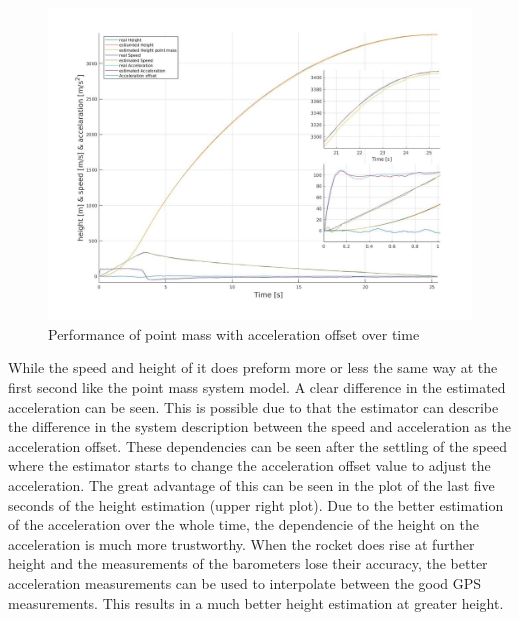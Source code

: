 \begin{figure}[h!]
 \centering
 \includegraphics[width=.8 \textwidth]{./Pictures/PointMassOffsetPerformance.jpg}
 \caption{Performance of point mass with acceleration offset over time}
 \label{fig:PointMassOffsetPerformance}
\end{figure}

While the speed and height of it does preform more or less the same way at the first second like the point mass system model.
A clear difference in the estimated acceleration can be seen.
This is possible due to that the estimator can describe the difference in the system description between the speed and acceleration as the acceleration offset.
These dependencies can be seen after the settling of the speed where the estimator starts to change the acceleration offset value to adjust the acceleration.
The great advantage of this can be seen in the plot of the last five seconds of the height estimation (upper right plot).
Due to the better estimation of the acceleration over the whole time, the dependencie of the height on the acceleration is much more trustworthy.
When the rocket does rise at further height and the measurements of the barometers lose their accuracy,
the better acceleration measurements can be used to interpolate between the good GPS measurements.
This results in a much better height estimation at greater height.

